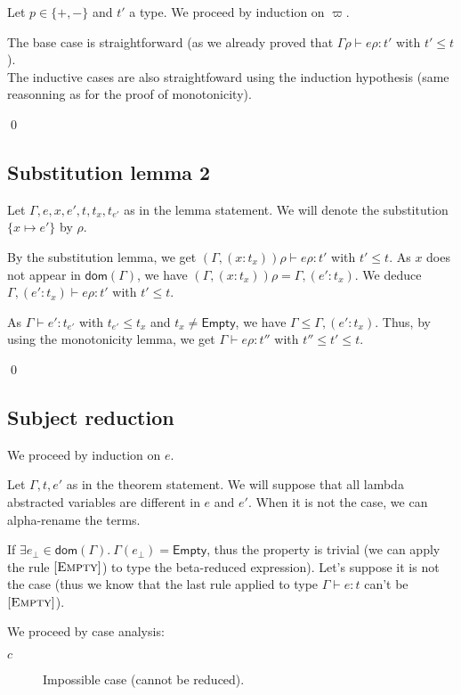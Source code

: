 \documentclass[a4paper]{article}%
\newcommand{\dom}[1]{\textsf{dom}(#1)}
\newcommand{\Empty} {\textsf{Empty}}%
\newcommand{\subst}[2]{\{#1 \mapsto #2\}}
\theoremstyle{definition}
\newcommand {\Rule}[1] {[\textsc{#1}]}
\begin{document}
    Let $p\in \{+,-\}$ and $t'$ a type.
    We proceed by induction on $\varpi$.

    The base case is straightforward (as we already proved that $\Gamma \rho \vdash e \rho:t'$ with $t'\leq t$).\\
    The inductive cases are also straightfoward using the induction hypothesis (same reasonning as for the proof of monotonicity).

    \qed

    \subsection{Substitution lemma 2}

    Let $\Gamma,e,x,e',t,t_x,t_{e'}$ as in the lemma statement.
    We will denote the substitution $\subst x {e'}$ by $\rho$.

    By the substitution lemma, we get $(\Gamma, (x:t_x))\rho \vdash e\rho:t'$ with $t' \leq t$.
    As $x$ does not appear in $\dom \Gamma$, we have $(\Gamma, (x:t_x))\rho = \Gamma, (e':t_x)$.
    We deduce $\Gamma, (e':t_x) \vdash e\rho:t'$ with $t' \leq t$.

    As $\Gamma \vdash e':t_{e'}$ with $t_{e'} \leq t_x$ and $t_x \neq \Empty$, we have $\Gamma \leq \Gamma, (e':t_x)$.
    Thus, by using the monotonicity lemma, we get $\Gamma\vdash e\rho:t''$ with $t'' \leq t' \leq t$.

    \qed

    \subsection{Subject reduction}

    We proceed by induction on $e$.

    Let $\Gamma,t,e'$ as in the theorem statement.
    We will suppose that all lambda abstracted variables are different in $e$ and $e'$. When it is not the case, we can alpha-rename the terms.

    If $\exists e_{\bot} \in \dom\Gamma.\ \Gamma(e_{\bot}) = \Empty$, thus the property is trivial
    (we can apply the rule $\Rule {Empty}$) to type the beta-reduced expression).
    Let's suppose it is not the case (thus we know that the last rule applied to type $\Gamma \vdash e:t$ can't be $\Rule{Empty}$).

    We proceed by case analysis:

    \begin{description}
      \item[$c$] Impossible case (cannot be reduced).
    \end{description}
\end{document}
